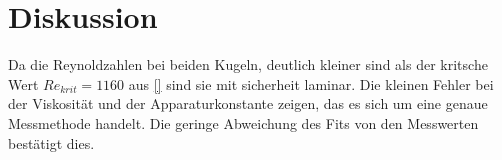 \section{Diskussion}
\label{sec:Diskussion}
Da die Reynoldzahlen bei beiden Kugeln, deutlich kleiner sind als der
kritsche Wert $Re_{krit}=1160$ aus \ref{} sind sie mit sicherheit laminar.
Die kleinen Fehler bei der Viskosität und der Apparaturkonstante zeigen, das
es sich um eine genaue Messmethode handelt. Die geringe Abweichung des Fits von
den Messwerten bestätigt dies.  
